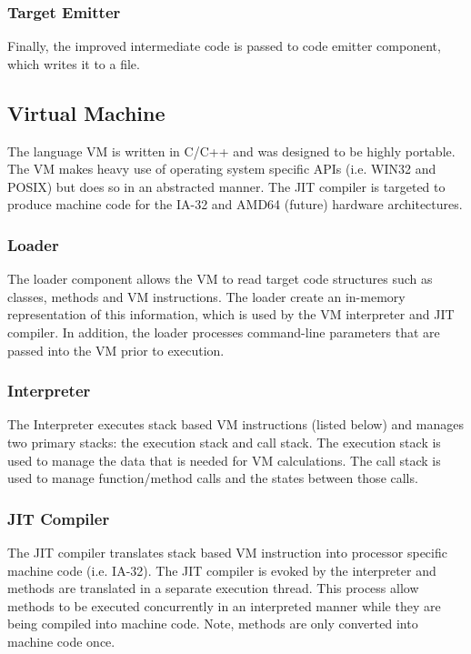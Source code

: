 \documentclass[12pt]{article}
\begin{document}
\subsubsection{Target Emitter}
Finally, the improved intermediate code is passed to code emitter component, which writes it to a file.

\subsection{Virtual Machine}
The language VM is written in C/C++ and was designed to be highly portable.  The VM makes heavy use of operating system specific APIs (i.e. WIN32 and POSIX) but does so in an abstracted manner.  The JIT compiler is targeted to produce machine code for the IA-32 and AMD64 (future) hardware architectures.  

\subsubsection{Loader}
The loader component allows the VM to read target code structures such as classes, methods and VM instructions.  The loader create an in-memory representation of this information, which is used by the VM interpreter and JIT compiler.  In addition, the loader processes command-line parameters that are passed into the VM prior to execution.

\subsubsection{Interpreter}
The Interpreter executes stack based VM instructions (listed below) and manages two primary stacks: the execution stack and call stack.  The execution stack is used to manage the data that is needed for VM calculations.  The call stack is used to manage function/method calls and the states between those calls.

\subsubsection{JIT Compiler}
The JIT compiler translates stack based VM instruction into processor specific machine code (i.e. IA-32).  The JIT compiler is evoked by the interpreter and methods are translated in a separate execution thread.  This process allow methods to be executed concurrently in an interpreted manner while they are being compiled into machine code.  Note, methods are only converted into machine code once.
\end{document}
